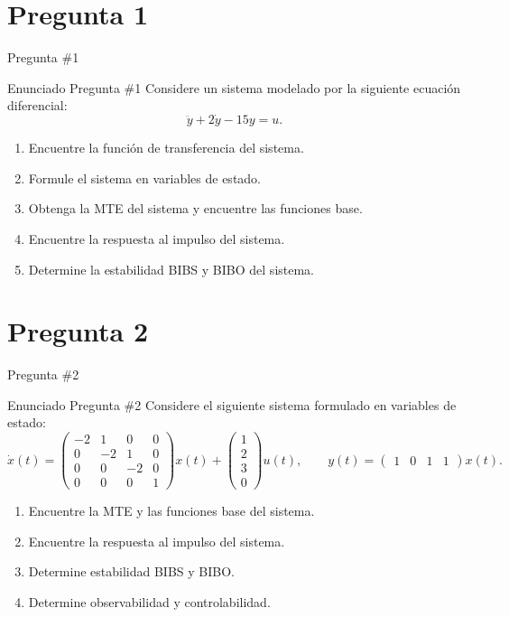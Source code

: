 \documentclass[
    10pt,
    aspectratio=169,
    xcolor={dvipsnames},
    spanish,
    ]{beamer}
\begin{document}
\section{Pregunta 1}
\begin{frame}{Pregunta \#1}
\begin{block}{Enunciado Pregunta \#1}
Considere un sistema modelado por la siguiente ecuación diferencial:
  \begin{equation}
    \ddot y + 2\dot y - 15 y = u.
  \end{equation}

  \begin{enumerate}
    \item Encuentre la función de transferencia del sistema.
    \item Formule el sistema en variables de estado.
    \item Obtenga la MTE del sistema y encuentre las funciones base.
    \item Encuentre la respuesta al impulso del sistema.
    \item Determine la estabilidad BIBS y BIBO del sistema.
  \end{enumerate}
\end{block}
\end{frame}
\section{Pregunta 2}
\begin{frame}{Pregunta \#2}
  \begin{block}{Enunciado Pregunta \#2}
   Considere el siguiente sistema formulado en variables de estado:
\begin{equation}
  \dot{x}(t) =
  \begin{pmatrix}
    -2 & 1 & 0 & 0 \\
     0 & -2 & 1 & 0 \\
     0 &  0 & -2 & 0 \\
     0 &  0 &  0 & 1
  \end{pmatrix} x(t)
  +
  \begin{pmatrix}
    1 \\
    2 \\
    3 \\
    0
  \end{pmatrix} u(t),
  \qquad
  y(t) = \begin{pmatrix} 1 & 0 & 1 & 1 \end{pmatrix} x(t).
\end{equation}

\begin{enumerate}
  \item Encuentre la MTE y las funciones base del sistema.
  \item Encuentre la respuesta al impulso del sistema.
  \item Determine estabilidad BIBS y BIBO.
  \item Determine observabilidad y controlabilidad.
\end{enumerate}

  \end{block}
\end{frame}

\end{document}
